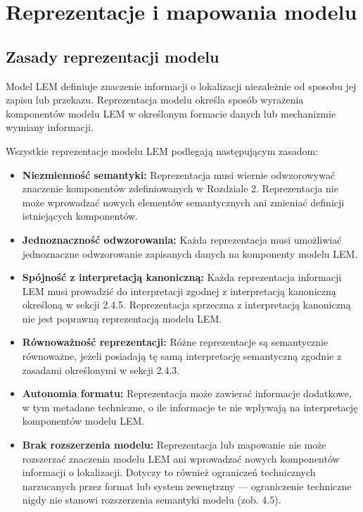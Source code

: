 
\chapter{Reprezentacje i mapowania modelu}
\label{chap:reprezentacje}

\section{Zasady reprezentacji modelu}
\label{sec:zasady-reprezentacji}
Model LEM definiuje znaczenie informacji o lokalizacji niezależnie od sposobu jej zapisu lub przekazu. Reprezentacja modelu określa sposób wyrażenia komponentów modelu LEM w określonym formacie danych lub mechanizmie wymiany informacji.

Wszystkie reprezentacje modelu LEM podlegają następującym zasadom:

\begin{itemize}
    \item \textbf{Niezmienność semantyki:} Reprezentacja musi wiernie odwzorowywać znaczenie komponentów zdefiniowanych w Rozdziale 2. Reprezentacja nie może wprowadzać nowych elementów semantycznych ani zmieniać definicji istniejących komponentów.
    \item \textbf{Jednoznaczność odwzorowania:} Każda reprezentacja musi umożliwiać jednoznaczne odwzorowanie zapisanych danych na komponenty modelu LEM.
    \item \textbf{Spójność z interpretacją kanoniczną:} Każda reprezentacja informacji LEM musi prowadzić do interpretacji zgodnej z interpretacją kanoniczną określoną w sekcji 2.4.5. Reprezentacja sprzeczna z interpretacją kanoniczną nie jest poprawną reprezentacją modelu LEM.
    \item \textbf{Równoważność reprezentacji:} Różne reprezentacje są semantycznie równoważne, jeżeli posiadają tę samą interpretację semantyczną zgodnie z zasadami określonymi w sekcji 2.4.3.
    \item \textbf{Autonomia formatu:} Reprezentacja może zawierać informacje dodatkowe, w tym metadane techniczne, o ile informacje te nie wpływają na interpretację komponentów modelu LEM.
    \item \textbf{Brak rozszerzenia modelu:} Reprezentacja lub mapowanie nie może rozszerzać znaczenia modelu LEM ani wprowadzać nowych komponentów informacji o lokalizacji. Dotyczy to również ograniczeń technicznych narzucanych przez format lub system zewnętrzny --- ograniczenie techniczne nigdy nie stanowi rozszerzenia semantyki modelu (zob. 4.5).
\end{itemize}

